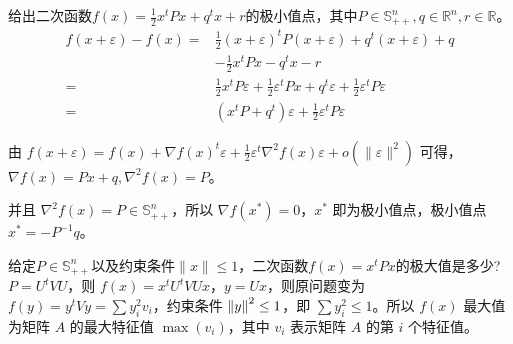 \begin{problem}
	给出二次函数$f(x)=\frac{1}{2}x^tPx+q^tx+r$的极小值点，其中$P\in\mathbb{S}_{++}^n,q\in\mathbb{R}^n,r\in\mathbb{R}$。
	\solution \begin{align*}
		f(x + \varepsilon) - f(x) =& \frac{1}{2} (x + \varepsilon)^tP(x + \varepsilon) + q^t(x + \varepsilon) + q \\
		& -\frac{1}{2} x^tPx - q^tx - r\\
		=& \frac{1}{2}x^tP\varepsilon + \frac{1}{2}\varepsilon^tPx + q^t\varepsilon + \frac{1}{2}\varepsilon^tP\varepsilon\\
		=& (x^tP + q^t)\varepsilon + \frac{1}{2}\varepsilon^tP\varepsilon
	\end{align*}
	
	由 $f(x + \varepsilon) = f(x) + \nabla f(x)^t\varepsilon + \frac{1}{2}\varepsilon^t \nabla^2 f(x) \varepsilon + o(\|\varepsilon\|^2)$ 可得，$\nabla f(x) = Px + q, \nabla^2 f(x) = P$。
	
	并且 $\nabla^2 f(x) = P\in \mathbb{S}^n_{++}$，所以 $\nabla f(x^*) = 0$，$x^*$ 即为极小值点，极小值点 $x^* = -P^{-1}q$。
\end{problem}


\begin{problem}
	给定$P\in\mathbb{S}_{++}^n$以及约束条件$\|x\|\le 1$，二次函数$f(x)=x^tPx$的极大值是多少?
	\solution $P = U^tVU$，则 $f(x) = x^tU^tVUx$，$y = Ux$，则原问题变为 $f(y) = y^tVy = \sum y_i^2v_i$，约束条件 $\norm{y}^2 \le 1$，即 $\sum y_i^2 \le 1$。所以 $f(x)$ 最大值为矩阵 $A$ 的最大特征值 $\max(v_i)$，其中 $v_i$ 表示矩阵 $A$ 的第 $i$ 个特征值。
\end{problem}

